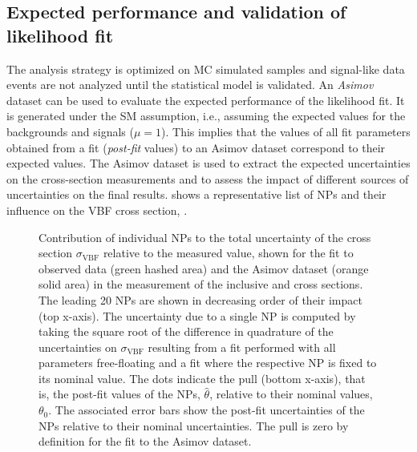 \subsection{Expected performance and validation of likelihood fit}
\label{subsec:expected-performannce}
The analysis strategy is optimized on MC simulated samples and signal-like data events are not analyzed until the statistical model is validated.
An \emph{Asimov} dataset can be used to evaluate the expected performance of the likelihood fit. It is generated under the SM assumption, i.e., assuming the expected values for the backgrounds and signals ($\mu=1$). 
This implies that the values of all fit parameters obtained from a fit (\emph{post-fit} values) to an Asimov dataset correspond to their expected values. 
The Asimov dataset is used to extract the expected uncertainties on the cross-section measurements and to assess the impact of different sources of uncertainties on the final results. 
 shows a representative list of NPs and their influence on the VBF cross section, \sigmaVBF. 
\begin{figure}[th]
    \centering
    {\caption{Contribution of individual NPs to the total uncertainty of the cross section $\sigma_{\mathrm{VBF}}$ relative to the measured value, shown for the fit to observed data (green hashed area) and the Asimov dataset (orange solid area) in the measurement of the inclusive \muVBF and \muGGF cross sections. The leading 20 NPs are shown in decreasing order of their impact (top x-axis).
    The uncertainty due to a single NP is computed by taking the square root of the difference in quadrature of the uncertainties on $\sigma_{\mathrm{VBF}}$ resulting from a fit performed with all parameters free-floating and a fit where the respective NP is fixed to its nominal value. 
    The dots indicate the pull (bottom x-axis), that is, the post-fit values of the NPs, $\hat{\theta}$, relative to their nominal values, $\theta_0$. 
    The associated error bars show the post-fit uncertainties of the NPs relative to their nominal uncertainties. 
    The pull is zero by definition for the fit to the Asimov dataset.
    \label{fig:fit:breakdown} }}
\end{figure}
